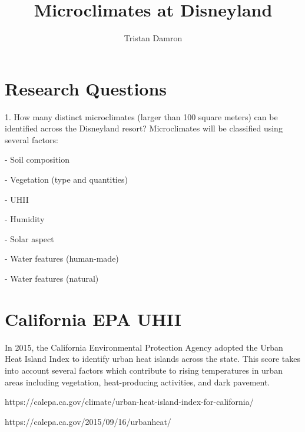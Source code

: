 \documentclass[11pt]{article}
\title{\textbf{Microclimates at Disneyland}}
\author{Tristan Damron}
\date{}
\begin{document}
\maketitle

\section{Research Questions}

1. How many distinct microclimates (larger than 100 square meters) can be identified across the Disneyland resort? Microclimates will be classified using several factors:

- Soil composition

- Vegetation (type and quantities)

- UHII

- Humidity

- Solar aspect
 
- Water features (human-made)

- Water features (natural)


\section{California EPA UHII}

In 2015, the California Environmental Protection Agency adopted the Urban Heat Island Index to identify urban heat islands across the state. This score takes into account several factors which contribute to rising temperatures in urban areas including vegetation, heat-producing activities, and dark pavement. 


https://calepa.ca.gov/climate/urban-heat-island-index-for-california/


https://calepa.ca.gov/2015/09/16/urbanheat/
\end{document}
